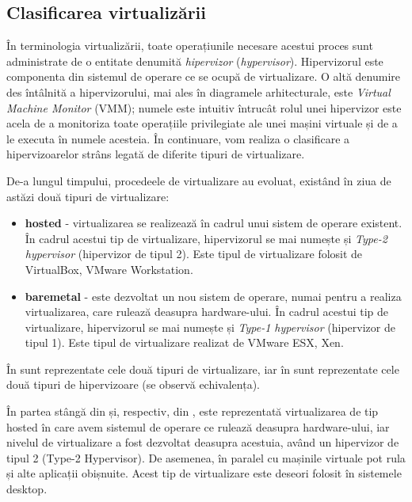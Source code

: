 \subsection{Clasificarea virtualizării}
\label{sec:vm:concepts:class}

În terminologia virtualizării, toate operațiunile necesare acestui proces sunt
administrate de o entitate denumită \textit{hipervizor} (\textit{hypervisor}). Hipervizorul este componenta din sistemul de operare ce se ocupă de
virtualizare. O altă denumire des întâlnită a hipervizorului, mai ales în
diagramele arhitecturale, este \textit{Virtual Machine Monitor}
(VMM); numele este intuitiv întrucât rolul
unei hipervizor este acela de a monitoriza toate operațiile privilegiate ale
unei mașini virtuale și de a le executa în numele acesteia. În
continuare, vom realiza o clasificare a hipervizoarelor strâns legată de
diferite tipuri de virtualizare.

De-a lungul timpului, procedeele de virtualizare au evoluat, existând în ziua de
astăzi două tipuri de virtualizare:

\begin{itemize}
  \item \textbf{hosted} - virtualizarea se realizează în cadrul unui sistem de
    operare existent. În cadrul acestui tip de
    virtualizare, hipervizorul se mai numește și \textit{Type-2 hypervisor}
    (hipervizor de tipul 2). Este tipul de virtualizare folosit de VirtualBox, VMware Workstation.
  \item \textbf{baremetal} - este dezvoltat un nou sistem de operare, numai pentru
    a realiza virtualizarea, care rulează deasupra hardware-ului.
    În cadrul acestui tip de virtualizare, hipervizorul se mai
    numește și \textit{Type-1 hypervisor} (hipervizor de tipul 1). Este tipul de virtualizare realizat de VMware ESX, Xen.
\end{itemize}

În  sunt reprezentate cele două tipuri
de virtualizare, iar în  sunt
reprezentate cele două tipuri de hipervizoare (se observă echivalența).

În partea stângă din
 și, respectiv, din
, este reprezentată
virtualizarea de tip hosted în care avem sistemul de operare ce rulează deasupra
hardware-ului, iar nivelul de virtualizare a fost dezvoltat deasupra acestuia,
având un hipervizor de tipul 2 (Type-2 Hypervisor). De asemenea, în paralel cu
mașinile virtuale pot rula și alte aplicații obișnuite. Acest tip de
virtualizare este deseori folosit în sistemele desktop.

